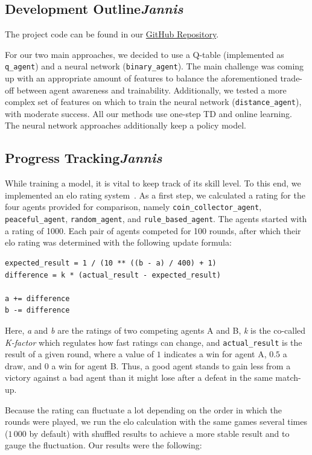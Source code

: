 \documentclass{article}
\begin{document}
\subsection[Development Outline]{{Development Outline}\normalsize \normalfont \it \hfill Jannis}

The project code can be found in our \href{https://github.com/xiaoxiae/BombermanML}{GitHub Repository}.\par

For our two main approaches, we decided to use a Q-table (implemented as \texttt{q\_agent}) and a neural network (\texttt{binary\_agent}). The main challenge was coming up with an appropriate amount of features to balance the aforementioned trade-off between agent awareness and trainability. Additionally, we tested a more complex set of features on which to train the neural network (\texttt{distance\_agent}), with moderate success. All our methods use one-step TD and online learning. The neural network approaches additionally keep a policy model.

\subsection[Progress Tracking]{{Progress Tracking}\normalsize \normalfont \it \hfill Jannis}

While training a model, it is vital to keep track of its skill level. To this end, we implemented an elo rating system~\cite{wiki:elo}. As a first step, we calculated a rating for the four agents provided for comparison, namely \texttt{coin\_collector\_agent}, \texttt{peaceful\_agent}, \texttt{random\_agent}, and \texttt{rule\_based\_agent}. The agents started with a rating of 1000. Each pair of agents competed for 100 rounds, after which their elo rating was determined with the following update formula:

\begin{verbatim}
expected_result = 1 / (10 ** ((b - a) / 400) + 1)
difference = k * (actual_result - expected_result)

a += difference
b -= difference
\end{verbatim}

Here, \textit{a} and \textit{b} are the ratings of two competing agents A and B, \textit{k} is the co-called \textit{K-factor} which regulates how fast ratings can change, and \texttt{actual\_result} is the result of a given round, where a value of $1$ indicates a win for agent A, $0.5$ a draw, and $0$ a win for agent B. Thus, a good agent stands to gain less from a victory against a bad agent than it might lose after a defeat in the same match-up.\par
Because the rating can fluctuate a lot depending on the order in which the rounds were played, we run the elo calculation with the same games several times ($1\,000$ by default) with shuffled results to achieve a more stable result and to gauge the fluctuation. Our results were the following:
\end{document}
